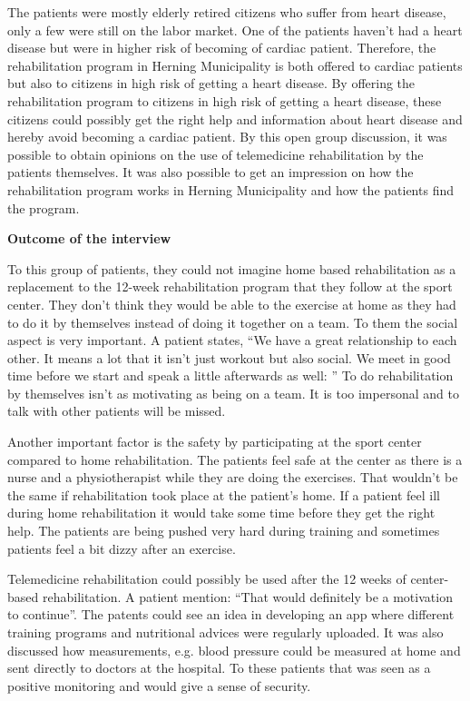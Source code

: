 The patients were mostly elderly retired citizens who suffer from heart disease, only a few were still on the labor market. One of the patients haven’t had a heart disease but were in higher risk of becoming of cardiac patient. Therefore, the rehabilitation program in Herning Municipality is both offered to cardiac patients but also to citizens in high risk of getting a heart disease. By offering the rehabilitation program to citizens in high risk of getting a heart disease, these citizens could possibly get the right help and information about heart disease and hereby avoid becoming a cardiac patient. By this open group discussion, it was possible to obtain opinions on the use of telemedicine rehabilitation by the patients themselves. It was also possible to get an impression on how the rehabilitation program works in Herning Municipality and how the patients find the program. 

\textbf{Outcome of the interview}

To this group of patients, they could not imagine home based rehabilitation as a replacement to the 12-week rehabilitation program that they follow at the sport center. They don’t think they would be able to the exercise at home as they had to do it by themselves instead of doing it together on a team. To them the social aspect is very important. A patient states, “We have a great relationship to each other. It means a lot that it isn’t just workout but also social. We meet in good time before we start and speak a little afterwards as well: ”  To do rehabilitation by themselves isn’t as motivating as being on a team. It is too impersonal and to talk with other patients will be missed. 

Another important factor is the safety by participating at the sport center compared to home rehabilitation. The patients feel safe at the center as there is a nurse and a physiotherapist while they are doing the exercises. That wouldn’t be the same if rehabilitation took place at the patient’s home. If a patient feel ill during home rehabilitation it would take some time before they get the right help. The patients are being pushed very hard during training and sometimes patients feel a bit dizzy after an exercise. 

Telemedicine rehabilitation could possibly be used after the 12 weeks of center-based rehabilitation. A patient mention: “That would definitely be a motivation to continue”. The patents could see an idea in developing an app where different training programs and nutritional advices were regularly uploaded. It was also discussed how measurements, e.g. blood pressure could be measured at home and sent directly to doctors at the hospital. To these patients that was seen as a positive monitoring and would give a sense of security.  

